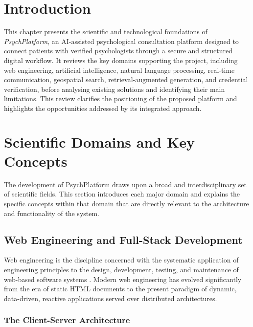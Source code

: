 \documentclass[a4paper,12pt]{report}
\begin{document}
\section*{Introduction}
{}

This chapter presents the scientific and technological foundations of \emph{PsychPlatform}, an AI-assisted psychological consultation platform designed to connect patients with verified psychologists through a secure and structured digital workflow. It reviews the key domains supporting the project, including web engineering, artificial intelligence, natural language processing, real-time communication, geospatial search, retrieval-augmented generation, and credential verification, before analysing existing solutions and identifying their main limitations. This review clarifies the positioning of the proposed platform and highlights the opportunities addressed by its integrated approach.

\section{Scientific Domains and Key Concepts}
\label{sec:domains}

The development of PsychPlatform draws upon a broad and interdisciplinary set of scientific fields. This section introduces each major domain and explains the specific concepts within that domain that are directly relevant to the architecture and functionality of the system.

\subsection{Web Engineering and Full-Stack Development}
\label{subsec:web-eng}

Web engineering is the discipline concerned with the systematic application of engineering principles to the design, development, testing, and maintenance of web-based software systems \cite{Murugesan2001}. Modern web engineering has evolved significantly from the era of static HTML documents to the present paradigm of dynamic, data-driven, reactive applications served over distributed architectures.

\subsubsection{The Client-Server Architecture}
\end{document}
